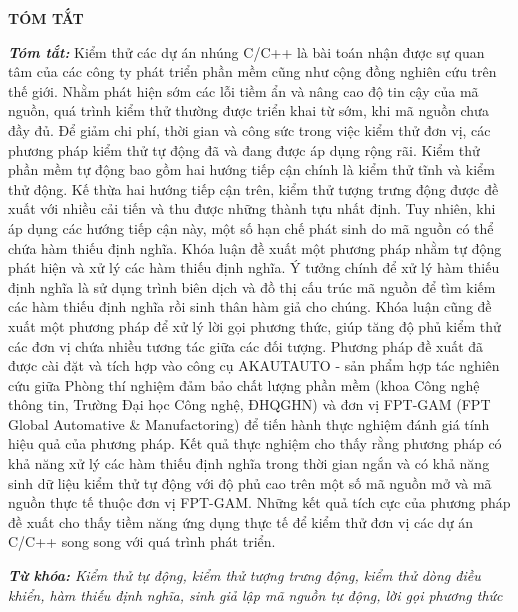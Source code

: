 \newpage
{}
\begin{center}
    \textbf{TÓM TẮT}
\end{center}
\changefontsizes[16pt]{12pt}
\textit{\textbf{Tóm tắt: }} 
Kiểm thử các dự án nhúng C/C++ là bài toán nhận được sự quan tâm của các công ty phát triển phần mềm cũng như cộng đồng nghiên cứu trên thế giới. Nhằm phát hiện sớm các lỗi tiềm ẩn và nâng cao độ tin cậy của mã nguồn, quá trình kiểm thử thường được triển khai từ sớm, khi mã nguồn chưa đầy đủ. Để giảm chi phí, thời gian và công sức trong việc kiểm thử đơn vị, các phương pháp kiểm thử tự động đã và đang được áp dụng rộng rãi. Kiểm thử phần mềm tự động bao gồm hai hướng tiếp cận chính là kiểm thử tĩnh và kiểm thử động. Kế thừa hai hướng tiếp cận trên, kiểm thử tượng trưng động được đề xuất với nhiều cải tiến và thu được những thành tựu nhất định. Tuy nhiên, khi áp dụng các hướng tiếp cận này, một số hạn chế phát sinh do mã nguồn có thể chứa hàm thiếu định nghĩa. Khóa luận đề xuất một phương pháp nhằm tự động phát hiện và xử lý các hàm thiếu định nghĩa. Ý tưởng chính để xử lý hàm thiếu định nghĩa là sử dụng trình biên dịch và đồ thị cấu trúc mã nguồn để tìm kiếm các hàm thiếu định nghĩa rồi sinh thân hàm giả cho chúng. Khóa luận cũng đề xuất một phương pháp để xử lý lời gọi phương thức, giúp tăng độ phủ kiểm thử các đơn vị chứa nhiều tương tác giữa các đối tượng. Phương pháp đề xuất đã được cài đặt và tích hợp vào công cụ AKAUTAUTO - sản phẩm hợp tác nghiên cứu giữa Phòng thí nghiệm đảm bảo chất lượng phần mềm (khoa Công nghệ thông tin, Trường Đại học Công nghệ, ĐHQGHN) và đơn vị FPT-GAM (FPT Global Automative \& Manufactoring) để tiến hành thực nghiệm đánh giá tính hiệu quả của phương pháp. Kết quả thực nghiệm cho thấy rằng phương pháp có khả năng xử lý các hàm thiếu định nghĩa trong thời gian ngắn và có khả năng sinh dữ liệu kiểm thử tự động với độ phủ cao trên một số mã nguồn mở và mã nguồn thực tế thuộc đơn vị FPT-GAM. Những kết quả tích cực của phương pháp đề xuất cho thấy tiềm năng ứng dụng thực tế để kiểm thử đơn vị các dự án C/C++ song song với quá trình phát triển.

\vspace{-0.5cm}
\begin{flushleft}
  \textit{\textbf{Từ khóa: } Kiểm thử tự động, kiểm thử tượng trưng động, kiểm thử dòng điều khiển, hàm thiếu định nghĩa, sinh giả lập mã nguồn tự động, lời gọi phương thức}
\end{flushleft}

